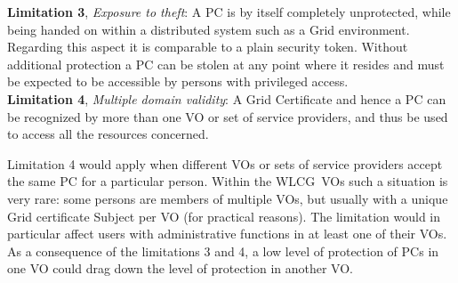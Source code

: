 \documentclass[10pt]{iopart}
\newcommand{\wlcg}{WLCG}
\begin{document}
\par
\begingroup
\leftskip=0.4cm
\noindent
\textbf{Limitation 3}, \textit{Exposure to theft}: A PC is by itself
completely unprotected, while being handed on within a distributed system such
as a Grid environment. Regarding this aspect it is comparable to a plain
security token. Without additional protection a PC can be stolen at any point
where it resides and must be expected to be accessible
by persons with privileged access.\\

\noindent
\textbf{Limitation 4}, \textit{Multiple domain validity}:
A Grid Certificate and hence a PC can be recognized by more than one VO or
set of service providers, and thus be used to access all the resources
concerned.\\
\par
\endgroup\noindent
Limitation 4 would apply when different VOs or sets of
service providers accept the same PC for a particular person.
Within the \wlcg\ VOs such a situation is very rare: some persons are members
of multiple VOs, but usually with a unique Grid certificate Subject per VO
(for practical reasons).
The limitation would in particular affect users with
administrative functions in at least one of their VOs. As a consequence of the
limitations 3 and 4, a low level of protection of PCs in one VO
could drag down the level of protection in another VO.
\end{document}
